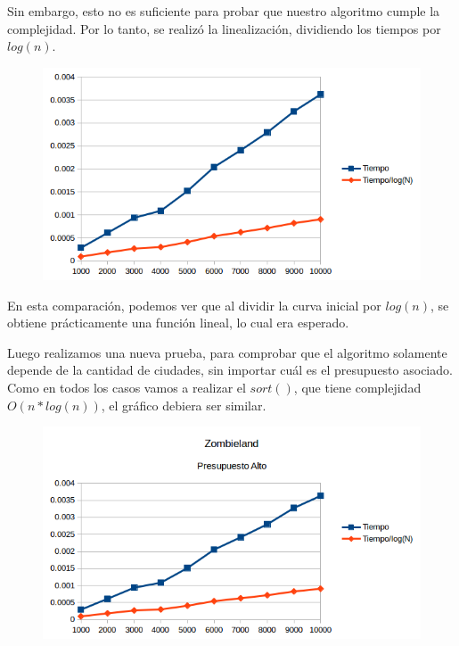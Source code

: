 Sin embargo, esto no es suficiente para probar que nuestro algoritmo cumple la complejidad. Por lo tanto, se realiz\'o la linealizaci\'on, dividiendo los tiempos por $log(n)$.

\newpage

 \begin{figure}[h!]
   \begin{center}
 	\includegraphics{imagenes/ej1/Mediciones/Grafico2.png}
   \end{center}
 \end{figure}

 En esta comparaci\'on, podemos ver que al dividir la curva inicial por $log(n)$, se obtiene pr\'acticamente una funci\'on lineal, lo cual era esperado.
 
Luego realizamos una nueva prueba, para comprobar que el algoritmo solamente depende de la cantidad de ciudades, sin importar cu\'al es el presupuesto asociado.
Como en todos los casos vamos a realizar el $sort()$, que tiene complejidad $O(n*log(n))$, el gr\'afico debiera ser similar.

 \begin{figure}[h!]
   \begin{center}
 	\includegraphics{imagenes/ej1/Mediciones/Grafico3.png}
   \end{center}
 \end{figure}

